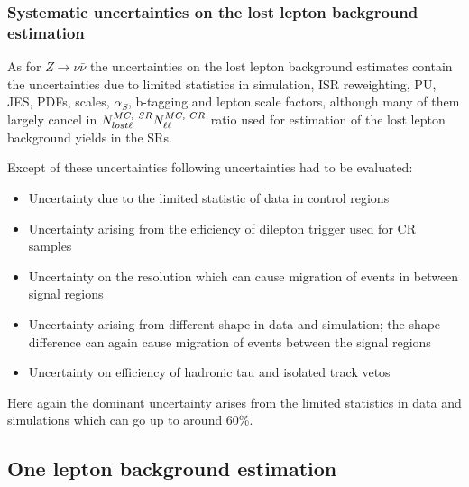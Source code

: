 \subsubsection{Systematic uncertainties on the lost lepton background estimation}

As for $Z \to \nu \bar{\nu}$ the uncertainties on the lost lepton background estimates contain the uncertainties due to limited statistics in simulation, ISR reweighting, PU, JES, PDFs, scales, $\alpha_{S}$, b-tagging and lepton scale factors, although many of them largely cancel in $N^{MC,~SR}_{lost \ell}\/ N^{MC,~CR}_{\ell\ell}$ ratio used for estimation of the lost lepton background yields in the SRs.

Except of these uncertainties following uncertainties had to be evaluated:

\begin{itemize} 
\item Uncertainty due to the limited statistic of data in control regions
\item Uncertainty arising from the efficiency of dilepton trigger used for CR samples
\item Uncertainty on the \MET resolution which can cause migration of events in between signal regions
\item Uncertainty arising from different \MET shape in data and simulation; the shape difference can again cause migration of events between the signal regions
\item Uncertainty on efficiency of hadronic tau and isolated track vetos %
\end{itemize}

Here again the dominant uncertainty arises from the limited statistics in data and simulations which can go up to around 60\%.

\subsection{One lepton background estimation}



